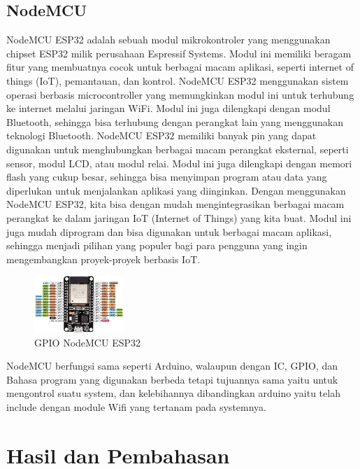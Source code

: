 \documentclass[conference]{IEEEtran}
\begin{document}
\subsection{NodeMCU}
\vspace{0.2cm}
NodeMCU ESP32 adalah sebuah modul mikrokontroler yang menggunakan chipset ESP32 milik perusahaan Espressif Systems. Modul ini memiliki beragam fitur yang membuatnya cocok untuk berbagai macam aplikasi, seperti internet of things (IoT), pemantauan, dan kontrol.
NodeMCU ESP32 menggunakan sistem operasi berbasis microcontroller yang memungkinkan modul ini untuk terhubung ke internet melalui jaringan WiFi. Modul ini juga dilengkapi dengan modul Bluetooth, sehingga bisa terhubung dengan perangkat lain yang menggunakan teknologi Bluetooth.
NodeMCU ESP32 memiliki banyak pin yang dapat digunakan untuk menghubungkan berbagai macam perangkat eksternal, seperti sensor, modul LCD, atau modul relai. Modul ini juga dilengkapi dengan memori flash yang cukup besar, sehingga bisa menyimpan program atau data yang diperlukan untuk menjalankan aplikasi yang diinginkan.
Dengan menggunakan NodeMCU ESP32, kita bisa dengan mudah mengintegrasikan berbagai macam perangkat ke dalam jaringan IoT (Internet of Things) yang kita buat. Modul ini juga mudah diprogram dan bisa digunakan untuk berbagai macam aplikasi, sehingga menjadi pilihan yang populer bagi para pengguna yang ingin mengembangkan proyek-proyek berbasis IoT.
\begin{figure}[h]
        \centering
        \includegraphics[width=0.3\textwidth]{nodemcu.jpg}
        \caption{GPIO NodeMCU ESP32}
\end{figure}
    NodeMCU berfungsi sama seperti Arduino, walaupun dengan IC, GPIO, dan Bahasa program yang digunakan berbeda tetapi tujuannya sama yaitu untuk mengontrol suatu system, dan kelebihannya dibandingkan arduino yaitu telah include dengan module Wifi yang tertanam pada systemnya.

\vspace{5cm}
\section{Hasil dan Pembahasan}
\end{document}

